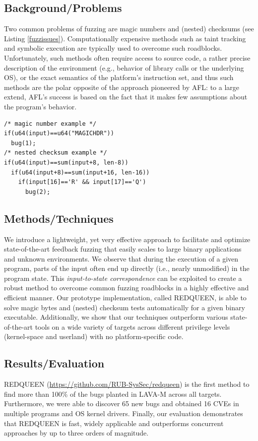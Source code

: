 \documentclass[]{article} %
\begin{document}
\subsection{Background/Problems}
Two common problems of fuzzing are magic numbers
and (nested) checksums (see Listing \ref{fuzzissues}). Computationally expensive methods such
as taint tracking and symbolic execution are typically used to
overcome such roadblocks. Unfortunately, such methods often
require access to source code, a rather precise description of the
environment (e.g., behavior of library calls or the underlying OS),
or the exact semantics of the platform's instruction set, and thus 
such methods are the polar opposite of the approach pioneered by AFL: to a
large extend, AFL's success is based on the fact that it makes
few assumptions about the program's behavior.
\begin{lstlisting}[label=fuzzissues,language={[ANSI]C}, caption={Roadblocks for feedback-driven fuzzing.}]
/* magic number example */
if(u64(input)==u64("MAGICHDR"))
  bug(1);
/* nested checksum example */
if(u64(input)==sum(input+8, len-8))
  if(u64(input+8)==sum(input+16, len-16))
    if(input[16]=='R' && input[17]=='Q')
      bug(2);
\end{lstlisting}

\subsection{Methods/Techniques}
We introduce a lightweight, yet very effective
approach to facilitate
and optimize state-of-the-art feedback fuzzing that easily scales
to large binary applications and unknown environments. We
observe that during the execution of a given program, parts
of the input often end up directly (i.e., nearly unmodified)
in the program state. This \emph{input-to-state correspondence} can
be exploited to create a robust method to overcome common
fuzzing roadblocks in a highly effective and efficient manner.
Our prototype implementation, called REDQUEEN, is able to
solve magic bytes and (nested) checksum tests automatically
for a given binary executable. Additionally, we show that our
techniques outperform various state-of-the-art tools on a wide
variety of targets across different privilege levels (kernel-space
and userland) with no platform-specific code.
\subsection{Results/Evaluation}
REDQUEEN (\url{https://github.com/RUB-SysSec/redqueen}) is the
first method to find more than 100\% of the bugs planted in
LAVA-M across all targets. Furthermore, we were able to discover
65 new bugs and obtained 16 CVEs in multiple programs and
OS kernel drivers. Finally, our evaluation demonstrates that
REDQUEEN is fast, widely applicable and outperforms concurrent
approaches by up to three orders of magnitude.
\end{document}
